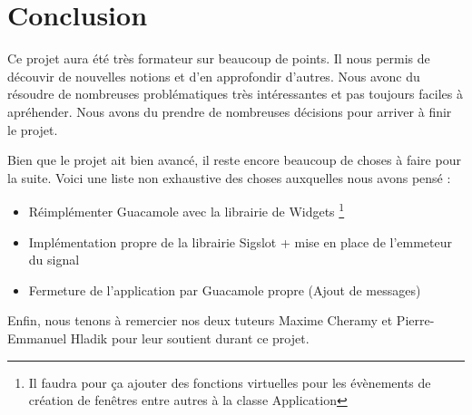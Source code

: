 \section{Conclusion}

Ce projet aura été très formateur sur beaucoup de points.
Il nous permis de découvir de nouvelles notions et d'en approfondir d'autres.
Nous avonc du résoudre de nombreuses problématiques très intéressantes et pas toujours faciles à apréhender.
Nous avons du prendre de nombreuses décisions pour arriver à finir le projet.

Bien que le projet ait bien avancé, il reste encore beaucoup de choses à faire pour la suite. Voici une liste non exhaustive des choses auxquelles nous avons pensé :

\begin{itemize}
  \item Réimplémenter Guacamole avec la librairie de Widgets
      \footnote{Il faudra pour ça ajouter des fonctions virtuelles pour les évènements de création de fenêtres entre autres à la classe Application}
  \item Implémentation propre de la librairie Sigslot + mise en place de l'emmeteur du signal
  \item Fermeture de l'application par Guacamole propre (Ajout de messages)
\end{itemize}

Enfin, nous tenons à remercier nos deux tuteurs Maxime Cheramy et Pierre-Emmanuel Hladik pour leur soutient durant ce projet.